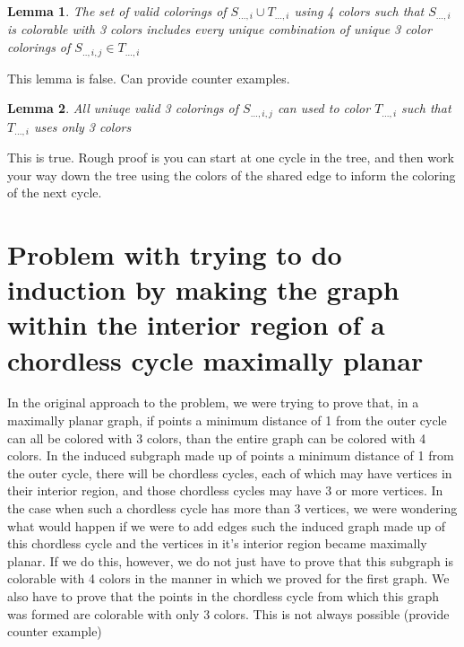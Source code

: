 \documentclass[11pt,a4paper]{report}
\theoremstyle{plain}
\newtheorem{lemma}{Lemma}[chapter] %
\theoremstyle{definition}
\begin{document}
\caption{S_0}

\caption{T_0}

\caption{S_{0, 0}}

\caption{S_{0, 1}}

\caption{S_{0, 2}}

\caption{T_{0, 0}}

\caption{S_{0, 0, 0}}

\caption{S_{0, 0, 1}}

\caption{S_{0, 0, 2}}

\caption{S_{0, 0, 3}}

\begin{lemma}
  The set of valid colorings of $S_{..., i} \cup T_{..., i}$ using 4 colors such that $S_{..., i}$ is colorable with 3 colors includes every unique combination of unique 3 color colorings of $S_{.., i, j} \in T_{..., i}$
\end{lemma}

This lemma is false. Can provide counter examples.

\begin{lemma}
  All uniuqe valid 3 colorings of $S_{..., i, j}$ can used to color $T_{..., i}$ such that $T_{..., i}$ uses only 3 colors
\end{lemma}

This is true. Rough proof is you can start at one cycle in the tree, and then work your way down the tree using the colors of the shared edge to inform the coloring of the next cycle.

\section{Problem with trying to do induction by making the graph within the interior region of a chordless cycle maximally planar}

In the original approach to the problem, we were trying to prove that, in a maximally planar graph, if points a minimum distance of 1 from the outer cycle can all be colored with 3 colors, than the entire graph can be colored with 4 colors. In the induced subgraph made up of points a minimum distance of 1 from the outer cycle, there will be chordless cycles, each of which may have vertices in their interior region, and those chordless cycles may have 3 or more vertices. In the case when such a chordless cycle has more than 3 vertices, we were wondering what would happen if we were to add edges such the induced graph made up of this chordless cycle and the vertices in it's interior region became maximally planar. If we do this, however, we do not just have to prove that this subgraph is colorable with 4 colors in the manner in which we proved for the first graph. We also have to prove that the points in the chordless cycle from which this graph was formed are colorable with only 3 colors. This is not always possible (provide counter example)
\end{document}
